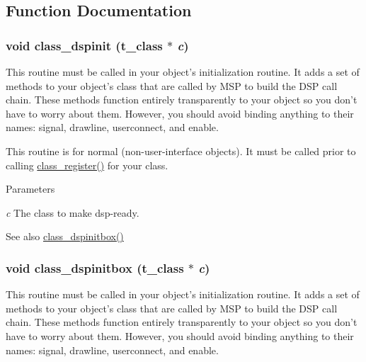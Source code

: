 \subsection{Function Documentation}
\hypertarget{group__msp_ga7427ae73a2ad71a1b4ef1bee2fd432fc}{
\subsubsection[{class\_\-dspinit}]{\setlength{\rightskip}{0pt plus 5cm}void class\_\-dspinit ({\bf t\_\-class} $\ast$ {\em c})}}
\label{group__msp_ga7427ae73a2ad71a1b4ef1bee2fd432fc}


This routine must be called in your object's initialization routine. It adds a set of methods to your object's class that are called by MSP to build the DSP call chain. These methods function entirely transparently to your object so you don't have to worry about them. However, you should avoid binding anything to their names: signal, drawline, userconnect, and enable.

This routine is for normal (non-\/user-\/interface objects). It must be called prior to calling \hyperlink{group__class_ga0709af4aad9570f0cb91711a5c6d34d1}{class\_\-register()} for your class.


\begin{DoxyParams}{Parameters}
\item[{\em c}]The class to make dsp-\/ready. \end{DoxyParams}
\begin{DoxySeeAlso}{See also}
\hyperlink{group__msp_gab2b27239f91fdd5bcc2bac299081687f}{class\_\-dspinitbox()} 
\end{DoxySeeAlso}
\hypertarget{group__msp_gab2b27239f91fdd5bcc2bac299081687f}{
\subsubsection[{class\_\-dspinitbox}]{\setlength{\rightskip}{0pt plus 5cm}void class\_\-dspinitbox ({\bf t\_\-class} $\ast$ {\em c})}}
\label{group__msp_gab2b27239f91fdd5bcc2bac299081687f}


This routine must be called in your object's initialization routine. It adds a set of methods to your object's class that are called by MSP to build the DSP call chain. These methods function entirely transparently to your object so you don't have to worry about them. However, you should avoid binding anything to their names: signal, drawline, userconnect, and enable.

